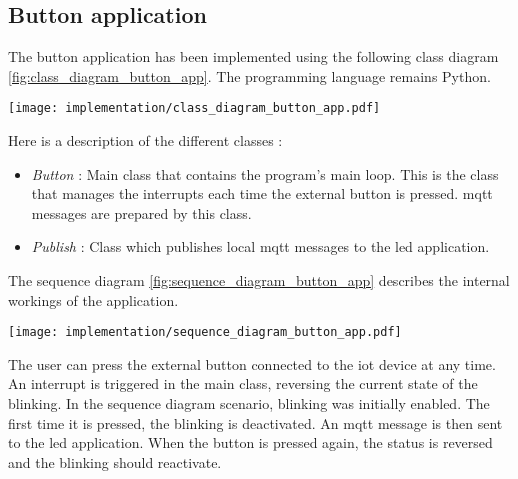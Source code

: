 \subsection{Button application}
The button application has been implemented using the following class diagram \ref{fig:class_diagram_button_app}. The programming language remains Python.
\begin{center}
    \begingroup
    \texttt{[image: implementation/class\_diagram\_button\_app.pdf]}
    \label{fig:class_diagram_button_app}
    \endgroup
\end{center}
Here is a description of the different classes :
\begin{itemize}
    \item \textit{Button} : Main class that contains the program's main loop. This is the class that manages the interrupts each time the external button is pressed. \acrshort{mqtt} messages are prepared by this class.
    \item \textit{Publish} : Class which publishes local \acrshort{mqtt} messages to the led application.
\end{itemize}

The sequence diagram \ref{fig:sequence_diagram_button_app} describes the internal workings of the application.
\begin{center}
    \begingroup
    \texttt{[image: implementation/sequence\_diagram\_button\_app.pdf]}
    \label{fig:sequence_diagram_button_app}
    \endgroup
\end{center}
The user can press the external button connected to the \acrshort{iot} device at any time. An interrupt is triggered in the main class, reversing the current state of the blinking. In the sequence diagram scenario, blinking was initially enabled. The first time it is pressed, the blinking is deactivated. An \acrshort{mqtt} message is then sent to the led application. When the button is pressed again, the status is reversed and the blinking should reactivate.


